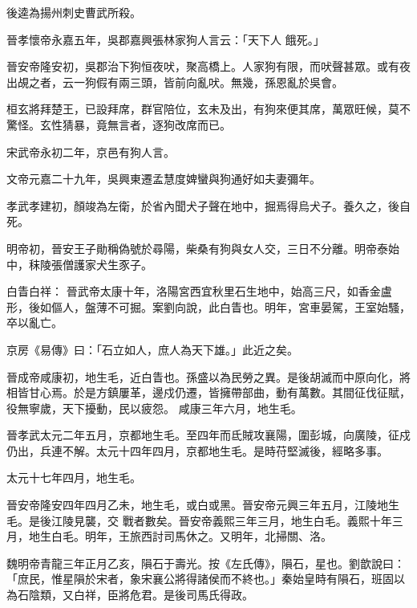 \begin{pinyinscope}
 後逵為揚州刺史曹武所殺。



 晉孝懷帝永嘉五年，吳郡嘉興張林家狗人言云：「天下人
 餓死。」



 晉安帝隆安初，吳郡治下狗恒夜吠，聚高橋上。人家狗有限，而吠聲甚眾。或有夜出覘之者，云一狗假有兩三頭，皆前向亂吠。無幾，孫恩亂於吳會。



 桓玄將拜楚王，已設拜席，群官陪位，玄未及出，有狗來便其席，萬眾旺候，莫不驚怪。玄性猜暴，竟無言者，逐狗改席而已。



 宋武帝永初二年，京邑有狗人言。



 文帝元嘉二十九年，吳興東遷孟慧度婢蠻與狗通好如夫妻彌年。



 孝武孝建初，顏竣為左衛，於省內聞犬子聲在地中，掘焉得烏犬子。養久之，後自死。



 明帝初，晉安王子勛稱偽號於尋陽，柴桑有狗與女人交，三日不分離。明帝泰始中，秣陵張僧護家犬生豕子。



 白眚白祥：
 晉武帝太康十年，洛陽宮西宜秋里石生地中，始高三尺，如香金盧形，後如傴人，盤薄不可掘。案劉向說，此白眚也。明年，宮車晏駕，王室始騷，卒以亂亡。



 京房《易傳》曰：「石立如人，庶人為天下雄。」此近之矣。



 晉成帝咸康初，地生毛，近白眚也。孫盛以為民勞之異。是後胡滅而中原向化，將相皆甘心焉。於是方鎮屢革，邊戍仍遷，皆擁帶部曲，動有萬數。其間征伐征賦，役無寧歲，天下擾動，民以疲怨。
 咸康三年六月，地生毛。



 晉孝武太元二年五月，京都地生毛。至四年而氐賊攻襄陽，圍彭城，向廣陵，征戍仍出，兵連不解。太元十四年四月，京都地生毛。是時苻堅滅後，經略多事。



 太元十七年四月，地生毛。



 晉安帝隆安四年四月乙未，地生毛，或白或黑。晉安帝元興三年五月，江陵地生毛。是後江陵見襲，交
 戰者數矣。晉安帝義熙三年三月，地生白毛。義熙十年三月，地生白毛。明年，王旅西討司馬休之。又明年，北掃關、洛。



 魏明帝青龍三年正月乙亥，隕石于壽光。按《左氏傳》，隕石，星也。劉歆說曰：「庶民，惟星隕於宋者，象宋襄公將得諸侯而不終也。」秦始皇時有隕石，班固以為石陰類，又白祥，臣將危君。是後司馬氏得政。




\end{pinyinscope}
